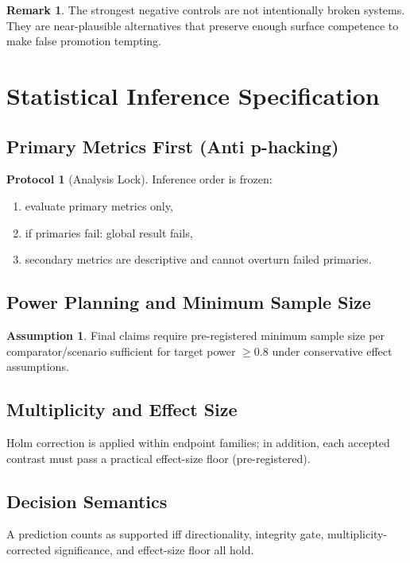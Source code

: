 \documentclass[11pt,a4paper]{article}
\theoremstyle{definition}
\newtheorem{remark}[theorem]{Remark}
\newtheorem{assumption}[theorem]{Assumption}
\newtheorem{protocol}[theorem]{Protocol}
\begin{document}
\begin{remark}
The strongest negative controls are not intentionally broken systems. They are
near-plausible alternatives that preserve enough surface competence to make false
promotion tempting.
\end{remark}

\section{Statistical Inference Specification}
\subsection{Primary Metrics First (Anti p-hacking)}
\begin{protocol}[Analysis Lock]
Inference order is frozen:
\begin{enumerate}
\item evaluate primary metrics only,
\item if primaries fail: global result fails,
\item secondary metrics are descriptive and cannot overturn failed primaries.
\end{enumerate}
\end{protocol}

\subsection{Power Planning and Minimum Sample Size}
\begin{assumption}
Final claims require pre-registered minimum sample size per comparator/scenario sufficient for target power $\ge 0.8$ under conservative effect assumptions.
\end{assumption}

\subsection{Multiplicity and Effect Size}
Holm correction is applied within endpoint families; in addition, each accepted contrast must pass a practical effect-size floor (pre-registered).

\subsection{Decision Semantics}
A prediction counts as supported iff directionality, integrity gate, multiplicity-corrected significance, and effect-size floor all hold.
\end{document}
